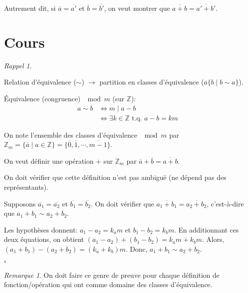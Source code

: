 \documentclass{report}
\newcounter{cours}
\newcommand*{\cours}{\section*{Cours \thecours}\stepcounter{cours}}
\newcommand*{\entiers}{\mathbb{Z}}
\theoremstyle{definition}
\theoremstyle{remark}
\newtheorem*{rema}{Remarque}
\newtheorem*{rappel}{Rappel}
\begin{document}
	Autrement dit, si $\overline{a} = \overline{a'}$ et $\overline{b} = \overline{b'}$, on veut montrer que $\overline{a+b} = \overline{a'+b'}$.

	\cours
	\begin{rappel}
		~

		\begin{ulist}[noitemsep]
			\item Relation d'\'equivalence ($\sim$) $\rightarrow$ partition en classes d'\'equivalence ($\overline{a}\{b \mid b \sim a\}$).
			\item \'Equivalence (congruence) $\mod m$ (sur $\entiers$):
			\begin{align*}
				a \sim b&\Leftrightarrow m \mid a-b\\
				&\Leftrightarrow \exists k \in \entiers \text{ t.q. } a-b=km
			\end{align*}

			On note l'ensemble des classes d'\'equivalence $\mod m$ par $\entiers_m = \{\overline{a} \mid a \in \entiers\} = \{\overline{0}, \overline{1}, \dotsb, \overline{m-1}\}$.

			On veut d\'efinir une op\'eration $+$ sur $\entiers_m$ par $\overline{a} + \overline{b} = \overline{a+b}$.

			On doit v\'erifier que cette d\'efinition n'est pas ambigu\"e (ne d\'epend pas des repr\'esentants).

			Supposons $\overline{a_1} = \overline{a_2}$ et $\overline{b_1} = \overline{b_2}$. On doit v\'erifier que $\overline{a_1+b_1} = \overline{a_2+b_2}$, c'est-\`a-dire que $a_1+b_1 \sim a_2+b_2$.

			Les hypoth\`eses donnent: $a_1-a_2=k_am$ et $b_1-b_2=k_bm$. En additionnant ces deux \'equations, on obtient $(a_1-a_2)+(b_1-b_2) = k_am+k_bm$. Alors, $(a_1+b_1) - (a_2+b_2) = (k_a+k_b)m$. Donc, $a_1+b_1 \sim a_2+b_2$.
			\begin{flushright}
				$\square$
			\end{flushright}
			\begin{rema}
				On doit faire ce genre de preuve pour chaque d\'efinition de fonction/op\'eration qui ont comme domaine des classes d'\'equivalence.
			\end{rema}
		\end{ulist}
	\end{rappel}
\end{document}
